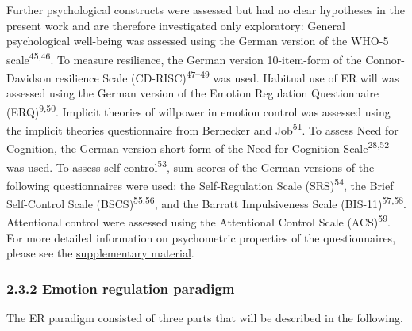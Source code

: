 \documentclass[
  man,floatsintext]{apa6}
\begin{document}
Further psychological constructs were assessed but had no clear hypotheses in the present work and are therefore investigated only exploratory:
General psychological well-being was assessed using the German version of the WHO-5 scale\textsuperscript{45,46}.
To measure resilience, the German version 10-item-form of the Connor-Davidson resilience Scale (CD-RISC)\textsuperscript{47--49} was used.
Habitual use of ER will was assessed using the German version of the Emotion Regulation Questionnaire (ERQ)\textsuperscript{9,50}.
Implicit theories of willpower in emotion control was assessed using the implicit theories questionnaire from Bernecker and Job\textsuperscript{51}.
To assess Need for Cognition, the German version short form of the Need for Cognition Scale\textsuperscript{28,52} was used.
To assess self-control\textsuperscript{53}, sum scores of the German versions of the following questionnaires were used: the Self-Regulation Scale (SRS)\textsuperscript{54}, the Brief Self-Control Scale (BSCS)\textsuperscript{55,56}, and the Barratt Impulsiveness Scale (BIS-11)\textsuperscript{57,58}.
Attentional control were assessed using the Attentional Control Scale (ACS)\textsuperscript{59}.
For more detailed information on psychometric properties of the questionnaires, please see the \protect\hyperlink{SupplementQuestionnaires}{supplementary material}.

\hypertarget{emotion-regulation-paradigm}{%
\subsubsection{2.3.2 Emotion regulation paradigm}\label{emotion-regulation-paradigm}}

The ER paradigm consisted of three parts that will be described in the following.
\end{document}
